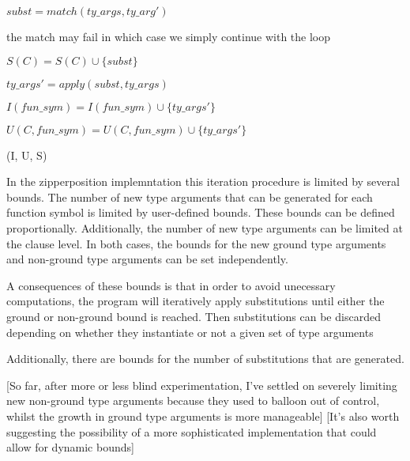 \documentclass{article}
\begin{document}
\begin{algorithm}
\begin{algorithmic}[1]
            
            \State \(subst = match(ty\_args, ty\_arg')\)

            \State \Comment the match may fail in which case we simply continue with the loop

            \State \(S(C) = S(C) \cup \{subst\}\)
         \EndFor
      \EndFor
   
   \EndFor

            \State \(ty\_args' = apply(subst, ty\_args)\)


               \State \(I(fun\_sym) = I(fun\_sym) \cup \{ty\_args'\}\)
            \Else

               \State \(U(C, fun\_sym) = U(C, fun\_sym) \cup \{ty\_args'\}\)
            \EndIf

         \EndFor
      \EndFor
   \EndFor

   \State \Return (I, U, S)

\EndFunction
\end{algorithmic}
\end{algorithm}
In the zipperposition implemntation this iteration procedure is limited by several bounds. The number of new type arguments that can be generated for each function symbol is limited by user-defined bounds. These bounds can be defined proportionally. Additionally, the number of new type arguments can be limited at the clause level. In both cases, the bounds for the new ground type arguments and non-ground type arguments can be set independently.

A consequences of these bounds is that in order to avoid unecessary computations, the program will iteratively apply substitutions until either the ground or non-ground bound is reached. Then substitutions can be discarded depending on whether they instantiate or not a given set of type arguments

Additionally, there are bounds for the number of substitutions that are generated.

[So far, after more or less blind experimentation, I've settled on severely limiting new non-ground type arguments because they used to balloon out of control, whilst the growth in ground type arguments is more manageable]
[It's also worth suggesting the possibility of a more sophisticated implementation that could allow for dynamic bounds]
\end{document}
